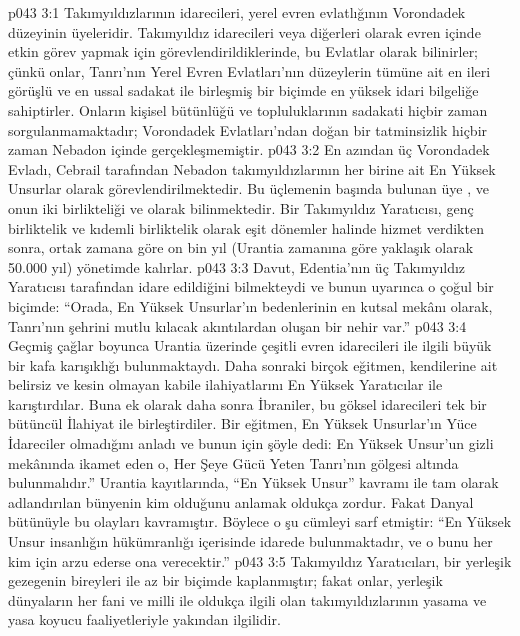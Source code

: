 \vs p043 3:1 Takımyıldızlarının idarecileri, yerel evren evlatlığının Vorondadek düzeyinin üyeleridir. Takımyıldız idarecileri veya diğerleri olarak evren içinde etkin görev yapmak için görevlendirildiklerinde, bu Evlatlar  olarak bilinirler; çünkü onlar, Tanrı’nın Yerel Evren Evlatları’nın düzeylerin tümüne ait en ileri görüşlü ve en ussal sadakat ile birleşmiş bir biçimde en yüksek idari bilgeliğe sahiptirler. Onların kişisel bütünlüğü ve topluluklarının sadakati hiçbir zaman sorgulanmamaktadır; Vorondadek Evlatları’ndan doğan bir tatminsizlik hiçbir zaman Nebadon içinde gerçekleşmemiştir.
\vs p043 3:2 En azından üç Vorondadek Evladı, Cebrail tarafından Nebadon takımyıldızlarının her birine ait En Yüksek Unsurlar olarak görevlendirilmektedir. Bu üçlemenin başında bulunan üye , ve onun iki birlikteliği  ve  olarak bilinmektedir. Bir Takımyıldız Yaratıcısı, genç birliktelik ve kıdemli birliktelik olarak eşit dönemler halinde hizmet verdikten sonra, ortak zamana göre on bin yıl (Urantia zamanına göre yaklaşık olarak 50.000 yıl) yönetimde kalırlar.
\vs p043 3:3 Davut, Edentia’nın üç Takımyıldız Yaratıcısı tarafından idare edildiğini bilmekteydi ve bunun uyarınca o çoğul bir biçimde: “Orada, En Yüksek Unsurlar’ın bedenlerinin en kutsal mekânı olarak, Tanrı’nın şehrini mutlu kılacak akıntılardan oluşan bir nehir var.”
\vs p043 3:4 Geçmiş çağlar boyunca Urantia üzerinde çeşitli evren idarecileri ile ilgili büyük bir kafa karışıklığı bulunmaktaydı. Daha sonraki birçok eğitmen, kendilerine ait belirsiz ve kesin olmayan kabile ilahiyatlarını En Yüksek Yaratıcılar ile karıştırdılar. Buna ek olarak daha sonra İbraniler, bu göksel idarecileri tek bir bütüncül İlahiyat ile birleştirdiler. Bir eğitmen, En Yüksek Unsurlar’ın Yüce İdareciler olmadığını anladı ve bunun için şöyle dedi: En Yüksek Unsur’un gizli mekânında ikamet eden o, Her Şeye Gücü Yeten Tanrı’nın gölgesi altında bulunmalıdır.” Urantia kayıtlarında, “En Yüksek Unsur” kavramı ile tam olarak adlandırılan bünyenin kim olduğunu anlamak oldukça zordur. Fakat Danyal bütünüyle bu olayları kavramıştır. Böylece o şu cümleyi sarf etmiştir: “En Yüksek Unsur insanlığın hükümranlığı içerisinde idarede bulunmaktadır, ve o bunu her kim için arzu ederse ona verecektir.”
\vs p043 3:5 Takımyıldız Yaratıcıları, bir yerleşik gezegenin bireyleri ile az bir biçimde kaplanmıştır; fakat onlar, yerleşik dünyaların her fani  ve milli  ile oldukça ilgili olan takımyıldızlarının yasama ve yasa koyucu faaliyetleriyle yakından ilgilidir.
